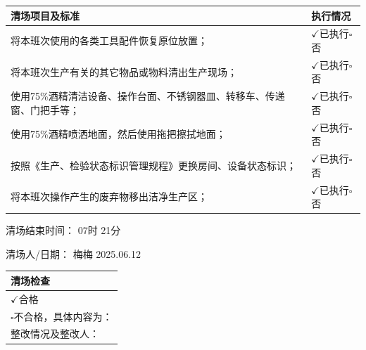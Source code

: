 \documentclass[UTF8,10pt,a4paper,fontset=fandol]{ctexart}
\newcommand{\fieldvalue}[1]{#1}
\newcommand{\handwritten}[1]{#1}
\let\mathcheckmark\checkmark
\renewcommand{\checkmark}{\ensuremath{\mathcheckmark}}
\begin{document}
\begin{center}
\begin{tabular}{|p{}|p{}|}
\hline
\centering 清场项目及标准 & \centering 执行情况 \arraybackslash \\
\hline
将本班次使用的各类工具配件恢复原位放置；
&
\fieldvalue{\handwritten{\checkmark}}已执行\quad $\square$否
\\
\hline
将本班次生产有关的其它物品或物料清出生产现场；
&
\fieldvalue{\handwritten{\checkmark}}已执行\quad $\square$否
\\
\hline
使用75\%酒精清洁设备、操作台面、不锈钢器皿、转移车、传递窗、门把手等；
&
\fieldvalue{\handwritten{\checkmark}}已执行\quad $\square$否
\\
\hline
使用75\%酒精喷洒地面，然后使用拖把擦拭地面；
&
\fieldvalue{\handwritten{\checkmark}}已执行\quad $\square$否
\\
\hline
按照《生产、检验状态标识管理规程》更换房间、设备状态标识；
&
\fieldvalue{\handwritten{\checkmark}}已执行\quad $\square$否
\\
\hline
将本班次操作产生的废弃物移出洁净生产区；
&
\fieldvalue{\handwritten{\checkmark}}已执行\quad $\square$否
\\
\hline
\end{tabular}
\end{center}

\noindent
清场结束时间：
\fieldvalue{\handwritten{07}}时
\fieldvalue{\handwritten{21}}分

\noindent
清场人/日期：
\fieldvalue{\handwritten{梅梅}}
\quad
\fieldvalue{\handwritten{2025.06.12}}

\begin{center}
\begin{tabular}{|p{}|}
\hline
清场检查 \\
\hline
\fieldvalue{\handwritten{\checkmark}}合格 \\
\hline
$\square$不合格，具体内容为： \\
\hline
整改情况及整改人： \\
\hline
\end{tabular}
\end{center}
\end{document}
